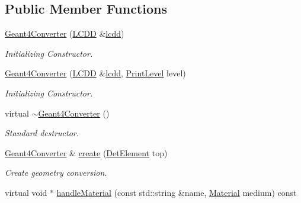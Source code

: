 \subsection*{Public Member Functions}
\begin{DoxyCompactItemize}
\item 
\hyperlink{class_d_d4hep_1_1_simulation_1_1_geant4_converter_aaed2b0700c7bdbc747a7c5cf0b0e4b0e}{Geant4\+Converter} (\hyperlink{class_d_d4hep_1_1_simulation_1_1_geant4_mapping_a7b098323f9ea570a13d220fe3f09da41}{L\+C\+DD} \&\hyperlink{class_d_d4hep_1_1_simulation_1_1_geant4_mapping_aa7dde906292e738792cfeb358785d611}{lcdd})
\begin{DoxyCompactList}\small\item\em Initializing Constructor. \end{DoxyCompactList}\item 
\hyperlink{class_d_d4hep_1_1_simulation_1_1_geant4_converter_a102d0182df67257e795fde27d685b830}{Geant4\+Converter} (\hyperlink{class_d_d4hep_1_1_simulation_1_1_geant4_mapping_a7b098323f9ea570a13d220fe3f09da41}{L\+C\+DD} \&\hyperlink{class_d_d4hep_1_1_simulation_1_1_geant4_mapping_aa7dde906292e738792cfeb358785d611}{lcdd}, \hyperlink{namespace_d_d4hep_a5b5a64d56252469451f2020a27d57d42}{Print\+Level} level)
\begin{DoxyCompactList}\small\item\em Initializing Constructor. \end{DoxyCompactList}\item 
virtual \hyperlink{class_d_d4hep_1_1_simulation_1_1_geant4_converter_a7f6a35aaa5aa5609700e21a061c142e3}{$\sim$\+Geant4\+Converter} ()
\begin{DoxyCompactList}\small\item\em Standard destructor. \end{DoxyCompactList}\item 
\hyperlink{class_d_d4hep_1_1_simulation_1_1_geant4_converter}{Geant4\+Converter} \& \hyperlink{class_d_d4hep_1_1_simulation_1_1_geant4_converter_ab43bb402a64c6647e47f4706097f8990}{create} (\hyperlink{class_d_d4hep_1_1_simulation_1_1_geant4_mapping_a58a1cf6fc60a0928c1048fb1d32fcea5}{Det\+Element} top)
\begin{DoxyCompactList}\small\item\em Create geometry conversion. \end{DoxyCompactList}\item 
virtual void $\ast$ \hyperlink{class_d_d4hep_1_1_simulation_1_1_geant4_converter_a20916425ac1291e88a8d4c44bed8ffb7}{handle\+Material} (const std\+::string \&name, \hyperlink{class_d_d4hep_1_1_simulation_1_1_geant4_mapping_a2539031128388f894af24898eb6189a7}{Material} medium) const

\end{DoxyCompactItemize}
